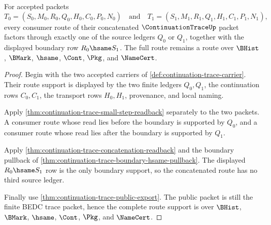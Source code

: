 \begin{theorem}
\label{thm:continuation-trace-route-support-totality}
For accepted packets
$$
T_0=(S_0,M_0,R_0,Q_0,H_0,C_0,P_0,N_0)
\quad\text{and}\quad
T_1=(S_1,M_1,R_1,Q_1,H_1,C_1,P_1,N_1),
$$
every consumer route of their concatenated $\ContinuationTraceUp$ packet factors through exactly one of the source ledgers $Q_0$ or $Q_1$, together with the displayed boundary row $R_0\hsame S_1$. The full route remains a route over $\BHist$, $\BMark$, $\hsame$, $\Cont$, $\Pkg$, and $\NameCert$.
\end{theorem}
\begin{proof}
Begin with the two accepted carriers of \autoref{def:continuation-trace-carrier}. Their route support is displayed by the two finite ledgers $Q_0,Q_1$, the continuation rows $C_0,C_1$, the transport rows $H_0,H_1$, provenance, and local naming.

Apply \autoref{thm:continuation-trace-small-step-readback} separately to the two packets. A consumer route whose read lies before the boundary is supported by $Q_0$, and a consumer route whose read lies after the boundary is supported by $Q_1$.

Apply \autoref{thm:continuation-trace-concatenation-readback} and the boundary pullback of \autoref{thm:continuation-trace-boundary-hsame-pullback}. The displayed $R_0\hsame S_1$ row is the only boundary support, so the concatenated route has no third source ledger.

Finally use \autoref{thm:continuation-trace-public-export}. The public packet is still the finite BEDC trace packet, hence the complete route support is over $\BHist$, $\BMark$, $\hsame$, $\Cont$, $\Pkg$, and $\NameCert$.
\end{proof}

